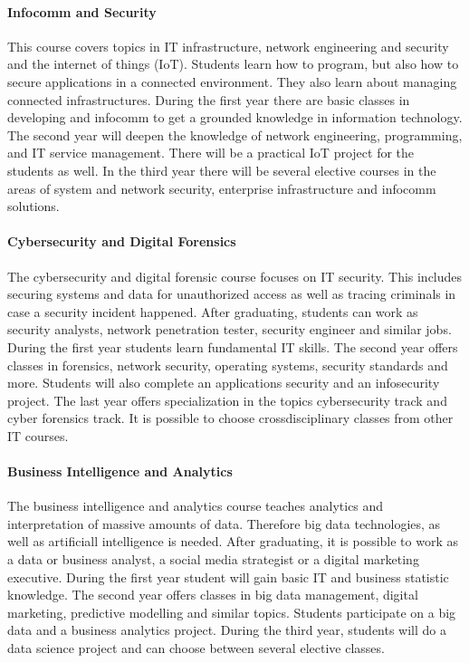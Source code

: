 \paragraph{Infocomm and Security}
This course covers topics in IT infrastructure, network engineering and security and the internet of things (IoT). Students learn how to program, but also how to secure applications in a connected environment. They also learn about managing connected infrastructures. During the first year there are basic classes in developing and infocomm to get a grounded knowledge in information technology. The second year will deepen the knowledge of network engineering, programming, and IT service management. There will be a practical IoT project for the students as well.
In the third year there will be several elective courses in the areas of system and network security, enterprise infrastructure and infocomm solutions.

\paragraph{Cybersecurity and Digital Forensics}
The cybersecurity and digital forensic course focuses on IT security. This includes securing systems and data for unauthorized access as well as tracing criminals in case a security incident happened. After graduating, students can work as security analysts, network penetration tester, security engineer and similar jobs. During the first year students learn fundamental IT skills. The second year offers classes in forensics, network security, operating systems, security standards and more. Students will also complete an applications security and an infosecurity project.
The last year offers specialization in the topics cybersecurity track and cyber forensics track. It is possible to choose crossdisciplinary classes from other IT courses.

\paragraph{Business Intelligence and Analytics}
The business intelligence and analytics course teaches analytics and interpretation of massive amounts of data. Therefore big data technologies, as well as artificiall intelligence is needed. After graduating, it is possible to work as a data or business analyst, a social media strategist or a digital marketing executive. During the first year student will gain basic IT and business statistic knowledge. The second year offers classes in big data management, digital marketing, predictive modelling and similar topics. Students participate on a big data and a business analytics project.
During the third year, students will do a data science project and can choose between several elective classes.


